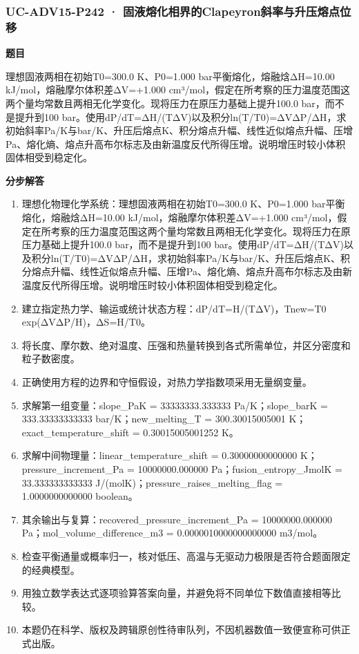 \documentclass[UTF8,11pt,a4paper]{ctexart}
\begin{document}
\subsubsection*{UC-ADV15-P242 · 固液熔化相界的Clapeyron斜率与升压熔点位移}
\noindent\textbf{题目}\par
理想固液两相在初始T0=300.0 K、P0=1.000 bar平衡熔化，熔融焓ΔH=10.00 kJ/mol，熔融摩尔体积差ΔV=+1.000 cm³/mol，假定在所考察的压力温度范围这两个量均常数且两相无化学变化。现将压力在原压力基础上提升100.0 bar，而不是提升到100 bar。使用dP/dT=ΔH/(TΔV)以及积分ln(T/T0)=ΔVΔP/ΔH，求初始斜率Pa/K与bar/K、升压后熔点K、积分熔点升幅、线性近似熔点升幅、压增Pa、熔化熵、熔点升高布尔标志及由新温度反代所得压增。说明增压时较小体积固体相受到稳定化。\par
\medskip\noindent\textbf{分步解答}
\begin{enumerate}
\item 理想化物理化学系统：理想固液两相在初始T0=300.0 K、P0=1.000 bar平衡熔化，熔融焓ΔH=10.00 kJ/mol，熔融摩尔体积差ΔV=+1.000 cm³/mol，假定在所考察的压力温度范围这两个量均常数且两相无化学变化。现将压力在原压力基础上提升100.0 bar，而不是提升到100 bar。使用dP/dT=ΔH/(TΔV)以及积分ln(T/T0)=ΔVΔP/ΔH，求初始斜率Pa/K与bar/K、升压后熔点K、积分熔点升幅、线性近似熔点升幅、压增Pa、熔化熵、熔点升高布尔标志及由新温度反代所得压增。说明增压时较小体积固体相受到稳定化。
\item 建立指定热力学、输运或统计状态方程：dP/dT=H/(TΔV)，Tnew=T0 exp(ΔVΔP/H)，ΔS=H/T0。
\item 将长度、摩尔数、绝对温度、压强和热量转换到各式所需单位，并区分密度和粒子数密度。
\item 正确使用方程的边界和守恒假设，对热力学指数项采用无量纲变量。
\item 求解第一组变量：slope\_PaK = 33333333.333333 Pa/K；slope\_barK = 333.33333333333 bar/K；new\_melting\_T = 300.30015005001 K；exact\_temperature\_shift = 0.30015005001252 K。
\item 求解中间物理量：linear\_temperature\_shift = 0.30000000000000 K；pressure\_increment\_Pa = 10000000.000000 Pa；fusion\_entropy\_JmolK = 33.333333333333 J/(molK)；pressure\_raises\_melting\_flag = 1.0000000000000 boolean。
\item 其余输出与复算：recovered\_pressure\_increment\_Pa = 10000000.000000 Pa；mol\_volume\_difference\_m3 = 0.0000010000000000000 m3/mol。
\item 检查平衡通量或概率归一，核对低压、高温与无驱动力极限是否符合题面限定的经典模型。
\item 用独立数学表达式逐项验算答案向量，并避免将不同单位下数值直接相等比较。
\item 本题仍在科学、版权及跨辑原创性待审队列，不因机器数值一致便宣称可供正式出版。
\end{enumerate}
\end{document}
